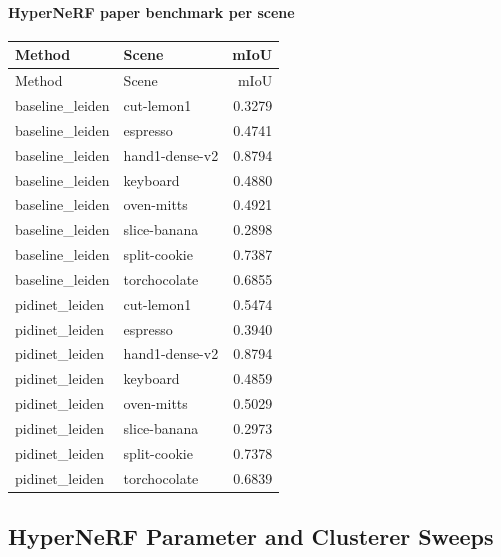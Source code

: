 \documentclass[10pt]{article}
\begin{document}
\paragraph{HyperNeRF paper benchmark per scene}
\small
\begin{longtable}{llr}
\toprule
Method & Scene & mIoU \\
\midrule
\endfirsthead
\toprule
Method & Scene & mIoU \\
\midrule
\endhead
baseline\_leiden & cut-lemon1 & 0.3279 \\
baseline\_leiden & espresso & 0.4741 \\
baseline\_leiden & hand1-dense-v2 & 0.8794 \\
baseline\_leiden & keyboard & 0.4880 \\
baseline\_leiden & oven-mitts & 0.4921 \\
baseline\_leiden & slice-banana & 0.2898 \\
baseline\_leiden & split-cookie & 0.7387 \\
baseline\_leiden & torchocolate & 0.6855 \\
pidinet\_leiden & cut-lemon1 & 0.5474 \\
pidinet\_leiden & espresso & 0.3940 \\
pidinet\_leiden & hand1-dense-v2 & 0.8794 \\
pidinet\_leiden & keyboard & 0.4859 \\
pidinet\_leiden & oven-mitts & 0.5029 \\
pidinet\_leiden & slice-banana & 0.2973 \\
pidinet\_leiden & split-cookie & 0.7378 \\
pidinet\_leiden & torchocolate & 0.6839 \\
\bottomrule
\end{longtable}
\normalsize

\subsection{HyperNeRF Parameter and Clusterer Sweeps}
\end{document}
